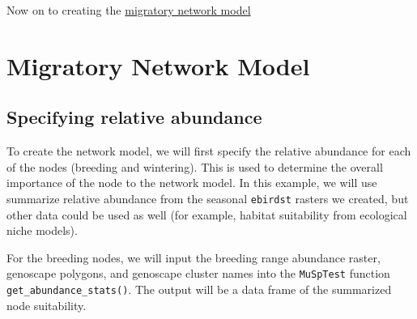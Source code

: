 \documentclass[
]{book}
\newenvironment{Shaded}{\begin{snugshade}}{\end{snugshade}}
\newcommand{\AttributeTok}[1]{\textcolor[rgb]{0.77,0.63,0.00}{#1}}
\newcommand{\DocumentationTok}[1]{\textcolor[rgb]{0.56,0.35,0.01}{\textbf{\textit{#1}}}}
\newcommand{\FunctionTok}[1]{\textcolor[rgb]{0.00,0.00,0.00}{#1}}
\newcommand{\NormalTok}[1]{#1}
\newcommand{\OtherTok}[1]{\textcolor[rgb]{0.56,0.35,0.01}{#1}}
\newcommand{\SpecialCharTok}[1]{\textcolor[rgb]{0.00,0.00,0.00}{#1}}
\newcommand{\StringTok}[1]{\textcolor[rgb]{0.31,0.60,0.02}{#1}}
\begin{document}
Now on to creating the \protect\hyperlink{connectivity}{migratory network model}

\hypertarget{connectivity}{%
\chapter{Migratory Network Model}\label{connectivity}}

\hypertarget{specifying-relative-abundance}{%
\section{Specifying relative abundance}\label{specifying-relative-abundance}}

To create the network model, we will first specify the relative abundance for each of the nodes (breeding and wintering). This is used to determine the overall importance of the node to the network model. In this example, we will use summarize relative abundance from the seasonal \texttt{ebirdst} rasters we created, but other data could be used as well (for example, habitat suitability from ecological niche models).

For the breeding nodes, we will input the breeding range abundance raster, genoscape polygons, and genoscape cluster names into the \texttt{MuSpTest} function \texttt{get\_abundance\_stats()}. The output will be a data frame of the summarized node suitability.

\begin{Shaded}
\end{Shaded}
\end{document}
